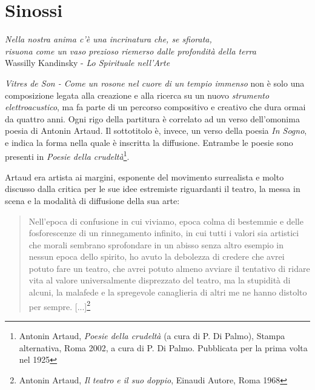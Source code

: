 
\chapter{Sinossi}
\label{chp:Sinossi}

	\begin{flushright}
		\textit{Nella nostra anima c'\`e una incrinatura che, se sfiorata, \\
		risuona come un vaso prezioso riemerso dalle profondit\`a della terra} \\
		Wassilly Kandinsky - \emph{Lo Spirituale nell'Arte}
	\end{flushright}

\textit{Vitres de Son - Come un rosone nel cuore di un tempio immenso} non è solo una composizione legata alla creazione e alla ricerca su un nuovo \textit{strumento elettroacustico}, ma fa parte di un percorso compositivo e creativo che dura ormai da quattro anni. Ogni rigo della partitura è correlato ad un verso dell'omonima poesia di Antonin Artaud. Il sottotitolo è, invece, un verso della poesia \textit{In Sogno}, e indica la forma nella quale è inscritta la diffusione. Entrambe le poesie sono presenti in \textit{Poesie della crudeltà}\footnote{Antonin Artaud, \textit{Poesie della crudeltà} (a cura di P. Di Palmo), Stampa alternativa, Roma 2002, a cura di P. Di Palmo. Pubblicata per la prima volta nel 1925}.

Artaud era artista ai margini, esponente del movimento surrealista e molto discusso dalla critica per le sue idee estremiste riguardanti il teatro, la messa in scena  e la modalità di diffusione della sua arte:

\begin{small}
\begin{quotation}
{\sf Nell'epoca di confusione in cui viviamo, epoca colma di bestemmie e delle fosforescenze di un rinnegamento infinito, in cui tutti i valori sia artistici che morali sembrano sprofondare in un abisso senza altro esempio in nessun epoca dello spirito, ho avuto la debolezza di credere che avrei potuto fare un teatro, che avrei potuto almeno avviare il tentativo di ridare vita al valore universalmente disprezzato del teatro, ma la stupidità di alcuni, la malafede e la spregevole canaglieria di altri me ne hanno distolto per sempre. [...]}\footnote{Antonin Artaud, \textit{Il teatro e il suo doppio}, Einaudi Autore, Roma 1968}
\end{quotation}
\end{small}

